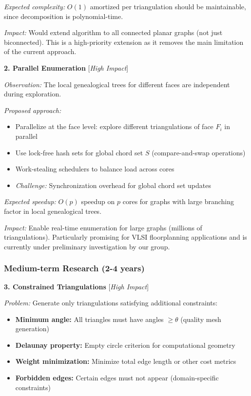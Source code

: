 \documentclass[12pt,a4paper]{article}
\theoremstyle{definition}
\theoremstyle{remark}
\begin{document}
\textit{Expected complexity:} $O(1)$ amortized per triangulation should be maintainable, since decomposition is polynomial-time.

\textit{Impact:} Would extend algorithm to all connected planar graphs (not just biconnected). This is a high-priority extension as it removes the main limitation of the current approach.

\textbf{2. Parallel Enumeration} [\textit{High Impact}]

\textit{Observation:} The local genealogical trees for different faces are independent during exploration.

\textit{Proposed approach:}
\begin{itemize}
\item Parallelize at the face level: explore different triangulations of face $F_i$ in parallel
\item Use lock-free hash sets for global chord set $S$ (compare-and-swap operations)
\item Work-stealing schedulers to balance load across cores
\item \textit{Challenge:} Synchronization overhead for global chord set updates
\end{itemize}

\textit{Expected speedup:} $O(p)$ speedup on $p$ cores for graphs with large branching factor in local genealogical trees.

\textit{Impact:} Enable real-time enumeration for large graphs (millions of triangulations). Particularly promising for VLSI floorplanning applications and is currently under preliminary investigation by our group.

\subsubsection{Medium-term Research (2-4 years)}

\textbf{3. Constrained Triangulations} [\textit{High Impact}]

\textit{Problem:} Generate only triangulations satisfying additional constraints:
\begin{itemize}
\item \textbf{Minimum angle:} All triangles must have angles $\geq \theta$ (quality mesh generation)
\item \textbf{Delaunay property:} Empty circle criterion for computational geometry
\item \textbf{Weight minimization:} Minimize total edge length or other cost metrics
\item \textbf{Forbidden edges:} Certain edges must not appear (domain-specific constraints)
\end{itemize}
\end{document}
